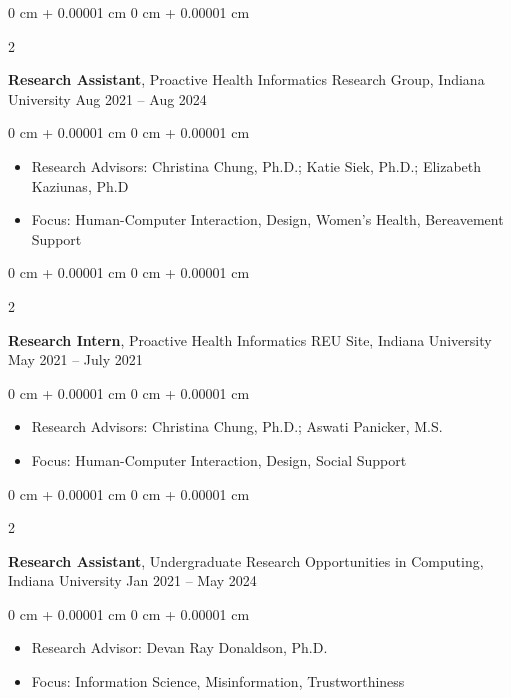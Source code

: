 \documentclass[10pt, letterpaper]{article}
\newenvironment{highlights}{
    \begin{itemize}[
        topsep=0.10 cm,
        parsep=0.10 cm,
        partopsep=0pt,
        itemsep=0pt,
        leftmargin=0 cm + 10pt
    ]
}{
    \end{itemize}
} %
\newenvironment{onecolentry}{
    \begin{adjustwidth}{
        0 cm + 0.00001 cm
    }{
        0 cm + 0.00001 cm
    }
}{
    \end{adjustwidth}
} %
\newenvironment{twocolentry}[2][]{
    \onecolentry
    \def\secondColumn{#2}
    \setcolumnwidth{\fill, 4.0 cm}
    \begin{paracol}{2}
}{
    \switchcolumn \raggedleft \secondColumn
    \end{paracol}
    \endonecolentry
} %
\begin{document}
        
        \begin{twocolentry}{
            Aug 2021 – Aug 2024
        }
            \textbf{Research Assistant}, Proactive Health Informatics Research Group, Indiana University\end{twocolentry}

        \vspace{0.10 cm}
        \begin{onecolentry}
            \begin{highlights}
                \item Research Advisors: Christina Chung, Ph.D.; Katie Siek, Ph.D.; Elizabeth Kaziunas, Ph.D
                \item Focus: Human-Computer Interaction, Design, Women's Health, Bereavement Support
            \end{highlights}
        \end{onecolentry}


        \vspace{0.21 cm}

        \begin{twocolentry}{
            May 2021 – July 2021
        }
            \textbf{Research Intern}, Proactive Health Informatics REU Site, Indiana University\end{twocolentry}

        \vspace{0.10 cm}
        \begin{onecolentry}
            \begin{highlights}
                \item Research Advisors: Christina Chung, Ph.D.; Aswati Panicker, M.S.
                \item Focus: Human-Computer Interaction, Design, Social Support
            \end{highlights}
        \end{onecolentry}


        \vspace{0.21 cm}

        \begin{twocolentry}{
            Jan 2021 – May 2024
        }
            \textbf{Research Assistant}, Undergraduate Research Opportunities in Computing, Indiana University\end{twocolentry}

        \vspace{0.10 cm}
        \begin{onecolentry}
            \begin{highlights}
                \item Research Advisor: Devan Ray Donaldson, Ph.D.
                \item Focus: Information Science, Misinformation, Trustworthiness
            \end{highlights}
        \end{onecolentry}
\end{document}
